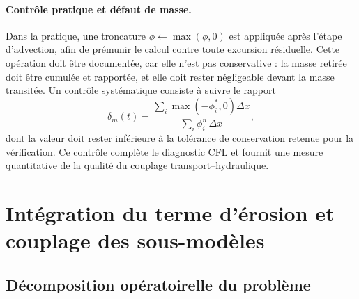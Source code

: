 \documentclass[11pt,a4paper]{report}
\begin{document}
\paragraph{Contrôle pratique et défaut de masse.} Dans la pratique, une troncature
\(\phi \leftarrow \max(\phi,0)\) est appliquée après l'étape d'advection, afin de prémunir le calcul contre
toute excursion résiduelle. Cette opération doit être documentée, car elle n'est pas conservative :
la masse retirée doit être cumulée et rapportée, et elle doit rester négligeable devant la masse
transitée. Un contrôle systématique consiste à suivre le rapport
\begin{equation}
\delta_m(t) = \frac{\displaystyle\sum_i\max\left(-\phi_i^*,0\right)\Delta x}
{\displaystyle\sum_i\phi_i^n\,\Delta x},
\label{eq:defaut-masse}
\end{equation}
dont la valeur doit rester inférieure à la tolérance de conservation retenue pour la vérification. Ce
contrôle complète le diagnostic CFL et fournit une mesure quantitative de la qualité du couplage
transport--hydraulique.



\section{Intégration du terme d'érosion et couplage des sous-modèles}
\label{sec:source-erosion}

\subsection{Décomposition opératoirelle du problème}
\end{document}
